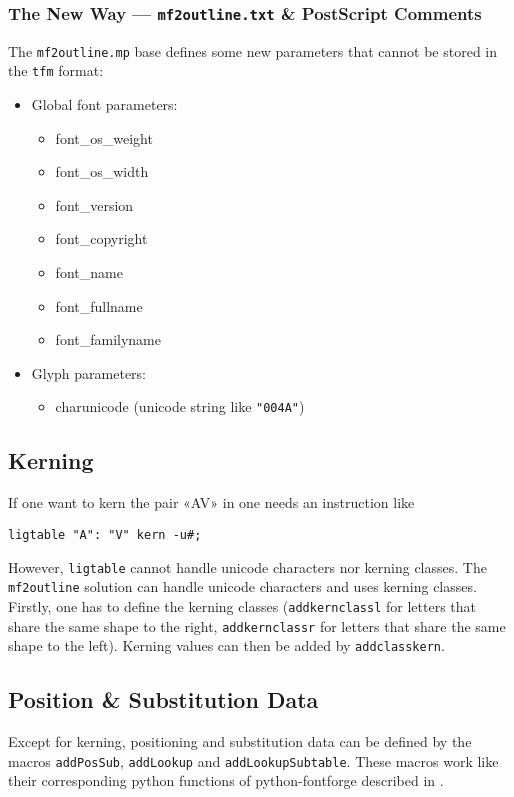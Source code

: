 \documentclass{scrartcl}
\begin{document}
\subsubsection{The New Way --- \texttt{mf2outline.txt} \& PostScript Comments}
%
The \texttt{mf2outline.mp} base defines some new parameters that cannot be stored in the \texttt{tfm} format:
\begin{itemize}
	\item Global font parameters:
	\begin{itemize}
		\item font\_os\_weight
		\item font\_os\_width
		\item font\_version
		\item font\_copyright
		\item font\_name
		\item font\_fullname
		\item font\_familyname
	\end{itemize}
	\item Glyph parameters:
	\begin{itemize}
		\item charunicode (unicode string like \verb|"004A"|)
	\end{itemize}
\end{itemize}
%
\subsection{Kerning}
%
If one want to kern the pair «AV» in \MF{} one needs an instruction like
\lstset{language=MetaPost,columns=fullflexible}
\begin{lstlisting}
ligtable "A": "V" kern -u#;
\end{lstlisting}
However, \texttt{ligtable} cannot handle unicode characters nor kerning classes. The \texttt{mf2outline} solution can handle unicode characters and uses kerning classes. Firstly, one has to define the kerning classes (\verb|addkernclassl| for letters that share the same shape to the right, \verb|addkernclassr| for letters that share the same shape to the left). Kerning values can then be added by \verb|addclasskern|.
%
\subsection{Position \& Substitution Data}
%
Except for kerning, positioning and substitution data can be defined by the macros \texttt{addPosSub}, \texttt{addLookup} and \texttt{addLookupSubtable}. These macros work like their corresponding python functions of python-fontforge described in \cite{williams15}.
%
\end{document}
